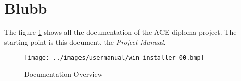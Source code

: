 \documentclass[11pt,a4paper]{article}
\begin{document}


\tableofcontents



\section{Blubb}
The figure \ref{fig:documentation overview} shows all the documentation of
the ACE diploma project. The starting point is this document, the 
\emph{Project Manual}.

\begin{figure}[H]
 \centering
 \texttt{[image: ../images/usermanual/win\_installer\_00.bmp]}
 \caption{Documentation Overview}
 \label{fig:documentation overview}
\end{figure}
\end{document}
